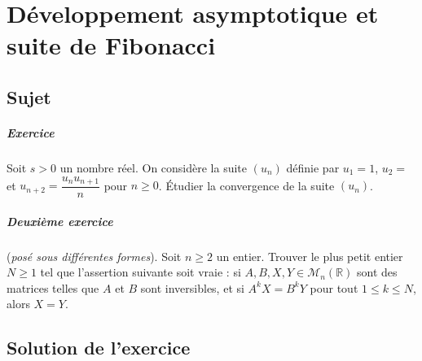 \chapter{Développement asymptotique et suite de Fibonacci}

\section{Sujet}

\paragraph{Exercice}
Soit \( s > 0 \) un nombre réel. On considère la suite \( (u_n) \) définie par \( u_1 = 1 \), \( u_2 =  \) et \( u_{n+2} = \dfrac{u_nu_{n+1}}{n} \) pour \( n \geqslant 0 \). Étudier la convergence de la suite \( (u_n) \). 

\paragraph{Deuxième exercice}
 (\textit{posé sous différentes formes}). Soit \( n \geqslant 2 \) un entier. Trouver le plus petit entier \( N \geqslant 1 \) tel que l'assertion suivante soit vraie : si \( A, B, X, Y \in \mathcal M_n(\mathbb R) \) sont des matrices telles que \( A \) et \( B \) sont inversibles, et si \( A^kX = B^kY \) pour tout \( 1 \leqslant k \leqslant  N \), alors \( X = Y \).
 
\section{Solution de l'exercice}

